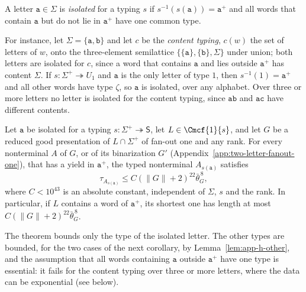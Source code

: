 \begin{definition}
\label{def:isolated-letter}
A letter $\mathtt a\in\Sigma$ is \emph{isolated} for a typing $s$ if
$s^{-1}(s(\mathtt a))=\mathtt a^+$ and all words that contain $\mathtt a$ but do
not lie in $\mathtt a^+$ have one common type.
\end{definition}

For instance, let $\Sigma=\{\mathtt a,\mathtt b\}$ and let $c$ be the
\emph{content typing}, $c(w)$ the set of letters of $w$, onto the
three-element semilattice $\{\{\mathtt a\},\{\mathtt b\},\Sigma\}$ under union;
both letters are isolated for $c$, since a word that contains $\mathtt a$ and
lies outside $\mathtt a^+$ has content $\Sigma$.  If $s:\Sigma^+\twoheadrightarrow
U_1$ and $\mathtt a$ is the only letter of type $1$, then $s^{-1}(1)=\mathtt a^+$
and all other words have type $\zeta$, so $\mathtt a$ is isolated, over any
alphabet.  Over three or more letters no letter is isolated for the content
typing, since $\mathtt{ab}$ and $\mathtt{ac}$ have different contents.

\begin{theorem}
\label{thm:two-letter-fanout-one}
Let $\mathtt a$ be isolated for a typing $s:\Sigma^+\twoheadrightarrow\mathsf S$,
let $L\in\Cmcf{1}{s}$, and let $G$ be a reduced good presentation of
$L\cap\Sigma^+$ of fan-out one and any rank.  For every nonterminal $A$ of $G$,
or of its binarization $G'$ \textup(Appendix~\ref{app:two-letter-fanout-one}\textup),
that has a yield in $\mathtt a^+$, the typed nonterminal $A_{s(\mathtt a)}$
satisfies
\[
 \tau_{A_{s(\mathtt a)}}\le C(\|G\|+2)^{22}\bar\theta_G^{\,8},
\]
where $C<10^{43}$ is an absolute constant, independent of $\Sigma$, $s$ and the
rank.  In particular, if $L$ contains a word of $\mathtt a^+$, its shortest one
has length at most $C(\|G\|+2)^{22}\bar\theta_G^{\,8}$.
\end{theorem}

The theorem bounds only the type of the isolated letter.  The other types are
bounded, for the two cases of the next corollary, by
Lemma~\ref{lem:app-h-other}, and the assumption that all words containing
$\mathtt a$ outside $\mathtt a^+$ have one type is essential: it fails for the
content typing over three or more letters, where the data can be exponential
(see below).

